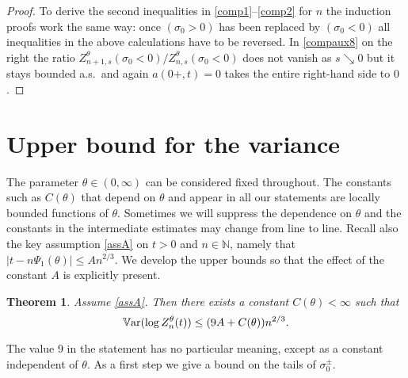 \documentclass[11pt]{amsart}
\newtheorem{theorem}{\sc Theorem}[section]
\numberwithin{equation}{section}
\theoremstyle{remark}
\providecommand{\abs}[1]{\vert#1\vert}
\begin{document}
\begin{proof}
To derive the second inequalities in  \eqref{comp1}--\eqref{comp2}   for $n$ 
the induction proofs work the same way: once $(\sigma_0>0)$ has been replaced
by $(\sigma_0<0)$   all inequalities in the above calculations have to be reversed. 
In \eqref{compaux8}  on the right the ratio  $Z_{n+1,s}^{\theta}(\sigma_0<0)/Z_{n,s}^{\theta}(\sigma_0<0)$
does not vanish as $s\searrow 0$ but it stays bounded a.s.~and again $a(0+,t)=0$ takes
the entire right-hand side to $0$.  
\end{proof}
 
\section{Upper bound for the variance }
The parameter ${\theta}\in(0,\infty)$ can be considered  fixed throughout.  The constants
such as 
$C({\theta})$ that depend on ${\theta}$ 
and  appear in all our statements are locally bounded functions of ${\theta}$.  {Sometimes we will suppress the dependence on ${\theta}$ and the constants in the intermediate estimates may change from line to line.}
Recall also the key assumption \eqref{assA} on $t>0$ and $n\in{\mathbb{N}}$, namely that 
$\abs{t-n {\Psi_1}({\theta})}\le A n^{2/3} $.  
We develop the upper bounds so that the effect of the constant  $A$ is explicitly present.  

\begin{theorem}\label{UBthm}  Assume \eqref{assA}.  
 Then there exists a constant $C({\theta})<\infty$ such that 
\begin{equation} 
{{\rm\mathbb{V}ar}} (\log Z_n^{\theta}(t))\le (9A+C({\theta})) n^{2/3}.
\end{equation}
\end{theorem}
The value 9 in the statement has no particular meaning, except as a constant
independent of ${\theta}$.  
 As a first step we give a bound on the tails of $\sigma_0^\pm$.
 
\end{document}
